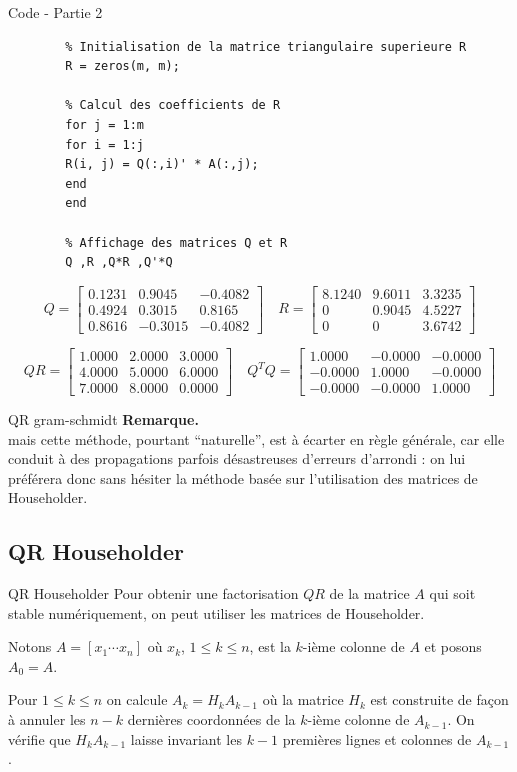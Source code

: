 \documentclass[french, 10pt]{beamer}
\theoremstyle{definition}
\begin{document}
\begin{frame}[fragile]{Code - Partie 2}
	\begin{lstlisting}
		% Initialisation de la matrice triangulaire superieure R
		R = zeros(m, m);
		
		% Calcul des coefficients de R
		for j = 1:m
		for i = 1:j
		R(i, j) = Q(:,i)' * A(:,j);
		end
		end
		
		% Affichage des matrices Q et R
		Q ,R ,Q*R ,Q'*Q 
	\end{lstlisting}
	\[
	Q =
	\begin{bmatrix}
		0.1231 & 0.9045 & -0.4082 \\
		0.4924 & 0.3015 & 0.8165 \\
		0.8616 & -0.3015 & -0.4082
	\end{bmatrix}
	\quad
	R =
	\begin{bmatrix}
		8.1240 & 9.6011 & 3.3235 \\
		0 & 0.9045 & 4.5227 \\
		0 & 0 & 3.6742
	\end{bmatrix}
	\]
	
	\[
	QR =
	\begin{bmatrix}
		1.0000 & 2.0000 & 3.0000 \\
		4.0000 & 5.0000 & 6.0000 \\
		7.0000 & 8.0000 & 0.0000
	\end{bmatrix}
	\quad
	Q^TQ =
	\begin{bmatrix}
		1.0000 & -0.0000 & -0.0000 \\
		-0.0000 & 1.0000 & -0.0000 \\
		-0.0000 & -0.0000 & 1.0000
	\end{bmatrix}
	\]
\end{frame}

\begin{frame}{QR gram-schmidt}
	\textbf{Remarque.}\\
	mais cette méthode, pourtant “naturelle”, est à écarter en règle générale, car elle conduit à des propagations parfois désastreuses d’erreurs d’arrondi : on lui préférera donc sans hésiter la méthode basée sur l’utilisation des matrices de Householder.
\end{frame}
\subsection*{QR Householder}

\begin{frame}{QR Householder}
	Pour obtenir une factorisation $QR$ de la matrice $A$ qui soit stable numériquement, on peut utiliser les matrices de Householder.
	
	Notons $A = [x_1 \cdots x_n]$ où $x_k$, $1 \leq k \leq n$, est la $k$-ième colonne de $A$ et posons $A_0 = A$.
	
	Pour $1 \leq k \leq n$ on calcule $A_k = H_k A_{k-1}$ où la matrice $H_k$ est construite de façon à annuler les $n - k$ dernières coordonnées de la $k$-ième colonne de $A_{k-1}$.
	On vérifie que $H_k A_{k-1}$ laisse invariant les $k - 1$ premières lignes et colonnes de $A_{k-1}$.
\end{frame}
\end{document}
